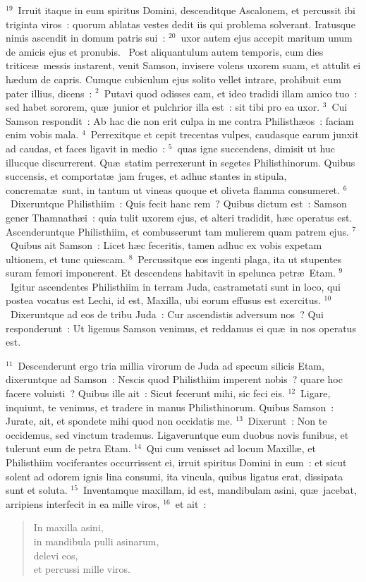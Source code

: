 ${}^{19}$~Irruit itaque in eum spiritus Domini, descenditque Ascalonem, et percussit ibi triginta viros~: quorum ablatas vestes dedit iis qui problema solverant. Iratusque nimis ascendit in domum patris sui~:
${}^{20}$~uxor autem ejus accepit maritum unum de amicis ejus et pronubis.
~Post aliquantulum autem temporis, cum dies tritice\ae\ messis instarent, venit Samson, invisere volens uxorem suam, et attulit ei h\ae dum de capris. Cumque cubiculum ejus solito vellet intrare, prohibuit eum pater illius, dicens~:
${}^{2}$~Putavi quod odisses eam, et ideo tradidi illam amico tuo~: sed habet sororem, qu\ae\ junior et pulchrior illa est~: sit tibi pro ea uxor.
${}^{3}$~Cui Samson respondit~: Ab hac die non erit culpa in me contra Philisth\ae os~: faciam enim vobis mala.
${}^{4}$~Perrexitque et cepit trecentas vulpes, caudasque earum junxit ad caudas, et faces ligavit in medio~:
${}^{5}$~quas igne succendens, dimisit ut huc illucque discurrerent. Qu\ae\ statim perrexerunt in segetes Philisthinorum. Quibus succensis, et comportat\ae\ jam fruges, et adhuc stantes in stipula, concremat\ae\ sunt, in tantum ut vineas quoque et oliveta flamma consumeret.
${}^{6}$~Dixeruntque Philisthiim~: Quis fecit hanc rem~? Quibus dictum est~: Samson gener Thamnath\ae i~: quia tulit uxorem ejus, et alteri tradidit, h\ae c operatus est. Ascenderuntque Philisthiim, et combusserunt tam mulierem quam patrem ejus.
${}^{7}$~Quibus ait Samson~: Licet h\ae c feceritis, tamen adhuc ex vobis expetam ultionem, et tunc quiescam.
${}^{8}$~Percussitque eos ingenti plaga, ita ut stupentes suram femori imponerent. Et descendens habitavit in spelunca petr\ae\ Etam.
${}^{9}$~Igitur ascendentes Philisthiim in terram Juda, castrametati sunt in loco, qui postea vocatus est Lechi, id est, Maxilla, ubi eorum effusus est exercitus.
${}^{10}$~Dixeruntque ad eos de tribu Juda~: Cur ascendistis adversum nos~? Qui responderunt~: Ut ligemus Samson venimus, et reddamus ei qu\ae\ in nos operatus est.


${}^{11}$~Descenderunt ergo tria millia virorum de Juda ad specum silicis Etam, dixeruntque ad Samson~: Nescis quod Philisthiim imperent nobis~? quare hoc facere voluisti~? Quibus ille ait~: Sicut fecerunt mihi, sic feci eis.
${}^{12}$~Ligare, inquiunt, te venimus, et tradere in manus Philisthinorum. Quibus Samson~: Jurate, ait, et spondete mihi quod non occidatis me.
${}^{13}$~Dixerunt~: Non te occidemus, sed vinctum trademus. Ligaveruntque eum duobus novis funibus, et tulerunt eum de petra Etam.
${}^{14}$~Qui cum venisset ad locum Maxill\ae , et Philisthiim vociferantes occurrissent ei, irruit spiritus Domini in eum~: et sicut solent ad odorem ignis lina consumi, ita vincula, quibus ligatus erat, dissipata sunt et soluta.
${}^{15}$~Inventamque maxillam, id est, mandibulam asini, qu\ae\ jacebat, arripiens interfecit in ea mille viros,
${}^{16}$~et ait~: \begin{flushleft}\begin{verse}In maxilla asini,\\ in mandibula pulli asinarum,\\ delevi eos,\\ et percussi mille viros.\end{verse}\end{flushleft}



